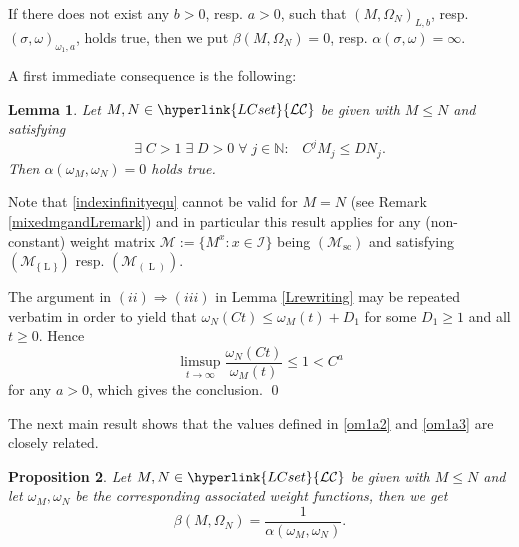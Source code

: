 \documentclass[10pt]{amsart}%
\numberwithin{equation}{section}
\theoremstyle{plain}
\newtheorem{proposition}{Proposition}[section]
\newtheorem{lemma}[proposition]{Lemma}
\newcommand{\NN}{\mathbb{N}}
\let\on=\operatorname
\begin{document}
If there does not exist any $b>0$, resp. $a>0$, such that $(M,\Omega_N)_{L,b}$, resp. $(\sigma,\omega)_{\omega_1,a}$, holds true, then we put $\beta(M,\Omega_N)=0$, resp. $\alpha(\sigma,\omega)=\infty$.


A first immediate consequence is the following:

\begin{lemma}\label{indexinfinity}
Let $M,N\in\hyperlink{LCset}{\mathcal{LC}}$ be given with $M\le N$ and satisfying
\begin{equation}\label{indexinfinityequ}
\exists\;C>1\;\exists\;D>0\;\forall\;j\in\NN:\;\;\;C^j M_j\le D N_j.
\end{equation}
Then $\alpha(\omega_M,\omega_N)=0$ holds true.
\end{lemma}

Note that \eqref{indexinfinityequ} cannot be valid for $M=N$ (see Remark \ref{mixedmgandLremark}) and in particular this result applies for any (non-constant) weight matrix $\mathcal{M}:=\{M^x: x\in\mathcal{I}\}$ being \hyperlink{Msc}{$(\mathcal{M}_{\on{sc}})$} and satisfying \hyperlink{R-L}{$(\mathcal{M}_{\{\on{L}\}})$} resp. \hyperlink{B-L}{$(\mathcal{M}_{(\on{L})})$}.

The argument in $(ii)\Rightarrow(iii)$ in Lemma \ref{Lrewriting} may be repeated verbatim in order to yield that $\omega_{N}(Ct)\le\omega_{M}(t)+D_1$ for some $D_1\ge 1$ and all $t\ge 0$. Hence
$$\limsup_{t\rightarrow\infty}\frac{\omega_{N}(Ct)}{\omega_M(t)}\le 1<C^{a}$$
for any $a>0$, which gives the conclusion.
\qed\enddemo

\vspace{6pt}
The next main result shows that the values defined in \eqref{om1a2} and \eqref{om1a3} are closely related.

\begin{proposition}\label{Lomega1comparison}
Let $M,N\in\hyperlink{LCset}{\mathcal{LC}}$ be given with $M\le N$ and let $\omega_{M}, \omega_{N}$ be the corresponding associated weight functions, then we get
$$
\beta(M,\Omega_N)=\frac{1}{\alpha(\omega_{M},\omega_{N})}.
$$
\end{proposition}
\end{document}

